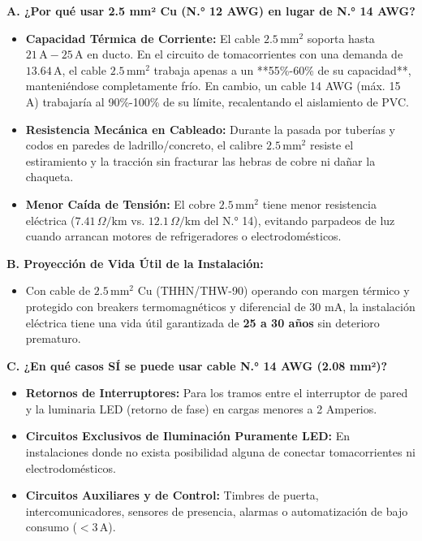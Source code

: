\documentclass[11pt,a4paper]{article}
\begin{document}
\begin{tcolorbox}[colback=BgGrey,colframe=DarkBlue,title=\textbf{3. Justificación del Conductor, Vida Útil y Caso de Cable N.° 14}]
    \textbf{A. ¿Por qué usar 2.5 mm² Cu (N.° 12 AWG) en lugar de N.° 14 AWG?}
    \begin{itemize}
        \item \textbf{Capacidad Térmica de Corriente:} El cable $2.5\,\text{mm}^2$ soporta hasta $21\,\text{A}-25\,\text{A}$ en ducto. En el circuito de tomacorrientes con una demanda de $13.64\,\text{A}$, el cable $2.5\,\text{mm}^2$ trabaja apenas a un **55\%-60\% de su capacidad**, manteniéndose completamente frío. En cambio, un cable 14 AWG (máx. 15 A) trabajaría al 90\%-100\% de su límite, recalentando el aislamiento de PVC.
        \item \textbf{Resistencia Mecánica en Cableado:} Durante la pasada por tuberías y codos en paredes de ladrillo/concreto, el calibre $2.5\,\text{mm}^2$ resiste el estiramiento y la tracción sin fracturar las hebras de cobre ni dañar la chaqueta.
        \item \textbf{Menor Caída de Tensión:} El cobre $2.5\,\text{mm}^2$ tiene menor resistencia eléctrica ($7.41\,\Omega/\text{km}$ vs. $12.1\,\Omega/\text{km}$ del N.° 14), evitando parpadeos de luz cuando arrancan motores de refrigeradores o electrodomésticos.
    \end{itemize}

    \textbf{B. Proyección de Vida Útil de la Instalación:}
    \begin{itemize}
        \item Con cable de $2.5\,\text{mm}^2$ Cu (THHN/THW-90) operando con margen térmico y protegido con breakers termomagnéticos y diferencial de 30 mA, la instalación eléctrica tiene una vida útil garantizada de \textbf{25 a 30 años} sin deterioro prematuro.
    \end{itemize}

    \textbf{C. ¿En qué casos SÍ se puede usar cable N.° 14 AWG (2.08 mm²)?}
    \begin{itemize}
        \item \textbf{Retornos de Interruptores:} Para los tramos entre el interruptor de pared y la luminaria LED (retorno de fase) en cargas menores a 2 Amperios.
        \item \textbf{Circuitos Exclusivos de Iluminación Puramente LED:} En instalaciones donde no exista posibilidad alguna de conectar tomacorrientes ni electrodomésticos.
        \item \textbf{Circuitos Auxiliares y de Control:} Timbres de puerta, intercomunicadores, sensores de presencia, alarmas o automatización de bajo consumo ($< 3\,\text{A}$).
    \end{itemize}
\end{tcolorbox}
\end{document}
